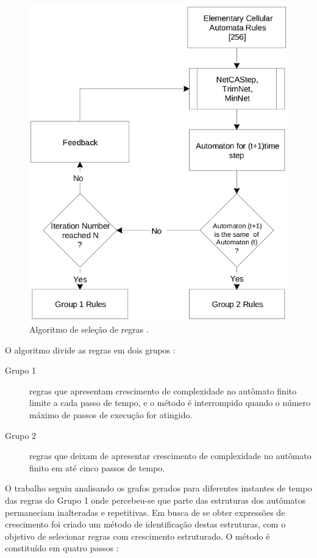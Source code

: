 \documentclass[12pt,a4paper]{article}
\begin{document}
\begin{figure}[htp]
\begin{center}
\includegraphics[scale=0.5]{img/rulesel.eps}
\caption{Algoritmo de seleção de regras .}
\label{fig:rulesel}
\end{center}
\end{figure}

O algoritmo divide as regras em dois grupos :

\begin{description}
\item[Grupo 1] regras que apresentam crescimento de complexidade no autômato
finito limite a cada passo de tempo, e o método é interrompido quando o
número máximo de passos de execução for atingido.
\item[Grupo 2] regras que deixam de apresentar crescimento de complexidade no
autômato finito em até cinco passos de tempo.
\end{description}

O trabalho seguiu analisando os grafos gerados para diferentes instantes de tempo
das regras do Grupo 1 onde percebeu-se que parte das estruturas dos autômatos
permaneciam inalteradas e repetitivas. Em busca de se obter expressões de crescimento
foi criado um método de identificação destas estruturas, com o objetivo de selecionar
regras com crescimento estruturado. O método é constituído em quatro passos
:
\end{document}
